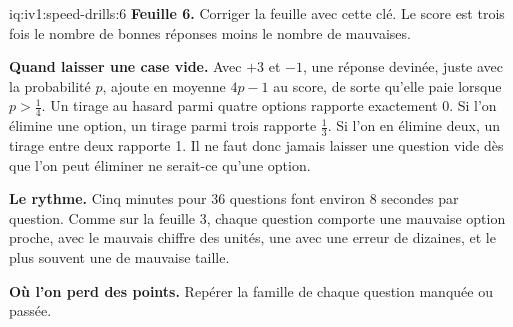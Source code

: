 \enlargethispage{-3\baselineskip}%
\begin{solution}{iq:iv1:speed-drills:6}
\textbf{Feuille 6.} Corriger la feuille avec cette clé. Le score est trois fois le nombre de bonnes réponses moins le nombre de mauvaises.
\par\nopagebreak


\textbf{Quand laisser une case vide.} Avec $+3$ et $-1$, une réponse devinée, juste avec la probabilité $p$, ajoute en moyenne $4p - 1$ au score, de sorte qu'elle paie lorsque $p > \tfrac14$. Un tirage au hasard parmi quatre options rapporte exactement 0. Si l'on élimine une option, un tirage parmi trois rapporte $\tfrac13$. Si l'on en élimine deux, un tirage entre deux rapporte 1. Il ne faut donc jamais laisser une question vide dès que l'on peut éliminer ne serait-ce qu'une option.

\textbf{Le rythme.} Cinq minutes pour 36 questions font environ 8 secondes par question. Comme sur la feuille 3, chaque question comporte une mauvaise option proche, avec le mauvais chiffre des unités, une avec une erreur de dizaines, et le plus souvent une de mauvaise taille.

\textbf{Où l'on perd des points.} Repérer la famille de chaque question manquée ou passée.


\end{solution}

